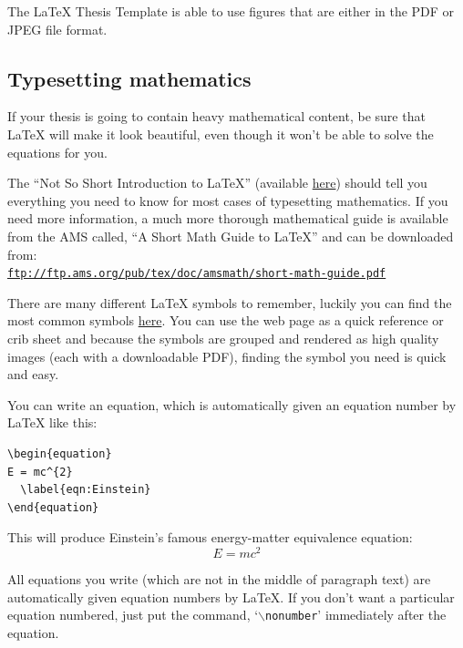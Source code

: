 The \LaTeX{} Thesis Template is able to use figures that are either in the PDF or JPEG file format.

\subsection{Typesetting mathematics}

If your thesis is going to contain heavy mathematical content, be sure that \LaTeX{} will make it look beautiful, even though it won't be able to solve the equations for you.

The ``Not So Short Introduction to \LaTeX{}'' (available \href{http://www.ctan.org/tex-archive/info/lshort/english/lshort.pdf}{here}) should tell you everything you need to know for most cases of typesetting mathematics. If you need more information, a much more thorough mathematical guide is available from the AMS called, ``A Short Math Guide to \LaTeX{}'' and can be downloaded from:\\
\href{ftp://ftp.ams.org/pub/tex/doc/amsmath/short-math-guide.pdf}{\texttt{ftp://ftp.ams.org/pub/tex/doc/amsmath/short-math-guide.pdf}}

There are many different \LaTeX{} symbols to remember, luckily you can find the most common symbols \href{http://www.sunilpatel.co.uk/latexsymbols.html}{here}. You can use the web page as a quick reference or crib sheet and because the symbols are grouped and rendered as high quality images (each with a downloadable PDF), finding the symbol you need is quick and easy.

You can write an equation, which is automatically given an equation number by \LaTeX{} like this:
\begin{verbatim}
\begin{equation}
E = mc^{2}
  \label{eqn:Einstein}
\end{equation}
\end{verbatim}

This will produce Einstein's famous energy-matter equivalence equation:
\begin{equation}
E = mc^{2}
\label{eqn:Einstein}
\end{equation}

All equations you write (which are not in the middle of paragraph text) are automatically given equation numbers by \LaTeX{}. If you don't want a particular equation numbered, just put the command, `$\backslash$\texttt{nonumber}' immediately after the equation.


